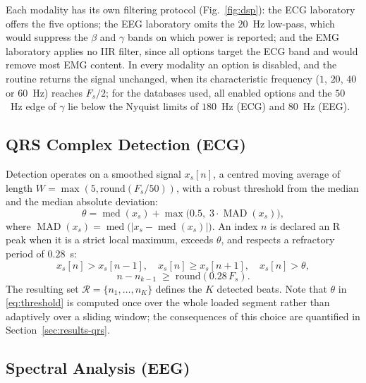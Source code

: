 \documentclass[conference]{IEEEtran}
\begin{document}
Each modality has its own filtering protocol (Fig.~\ref{fig:dsp}): the ECG laboratory offers the five options; the EEG laboratory omits the $20$~Hz low-pass, which would suppress the $\beta$ and $\gamma$ bands on which power is reported; and the EMG laboratory applies no IIR filter, since all options target the ECG band and would remove most EMG content. In every modality an option is disabled, and the routine returns the signal unchanged, when its characteristic frequency ($1$, $20$, $40$ or $60$~Hz) reaches $F_s/2$; for the databases used, all enabled options and the $50$~Hz edge of $\gamma$ lie below the Nyquist limits of $180$~Hz (ECG) and $80$~Hz (EEG).

\subsection{QRS Complex Detection (ECG)}
\label{sec:qrs}

Detection operates on a smoothed signal $x_s[n]$, a centred moving average of length $W=\max(5,\mathrm{round}(F_s/50))$, with a robust threshold from the median and the median absolute deviation:
\begin{equation}
\theta = \operatorname{med}(x_s) + \max\bigl(0.5,\; 3\cdot \operatorname{MAD}(x_s)\bigr),
\label{eq:threshold}
\end{equation}
where $\operatorname{MAD}(x_s)=\operatorname{med}\bigl(\lvert x_s-\operatorname{med}(x_s)\rvert\bigr)$. An index $n$ is declared an R peak when it is a strict local maximum, exceeds $\theta$, and respects a refractory period of $0.28$~s:
\begin{equation}
x_s[n] > x_s[n-1],\quad x_s[n]\ge x_s[n+1],\quad x_s[n] > \theta,
\label{eq:peakrule}
\end{equation}
\begin{equation}
n - n_{k-1} \;\ge\; \mathrm{round}(0.28\,F_s).
\label{eq:refractory}
\end{equation}
The resulting set $\mathcal{R}=\{n_1,\dots,n_K\}$ defines the $K$ detected beats. Note that $\theta$ in \eqref{eq:threshold} is computed once over the whole loaded segment rather than adaptively over a sliding window; the consequences of this choice are quantified in Section~\ref{sec:results-qrs}.

\subsection{Spectral Analysis (EEG)}
\end{document}
